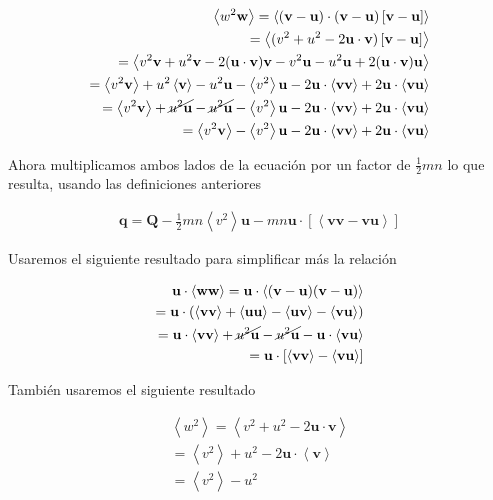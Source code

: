 \documentclass[11pt]{article}
\theoremstyle{definition}
\begin{document}
  \begin{eqnarray*}
    \left<w^2\textbf{w}\right> = \left<(\textbf{v} - \textbf{u})\cdot(\textbf{v} - \textbf{u})\left[\textbf{v} - \textbf{u}\right]\right> \\
    = \left<(v^2 + u^2 - 2\textbf{u}\cdot\textbf{v})\left[\textbf{v}-\textbf{u}\right]\right> \\
    = \left< v^2\textbf{v} + u^2\textbf{v} - 2(\textbf{u}\cdot\textbf{v})\textbf{v} - v^2\textbf{u} - u^2\textbf{u} + 2(\textbf{u}\cdot\textbf{v})\textbf{u}\right>\\
    = \left<v^2\textbf{v}\right> + u^2\left<\textbf{v}\right> - u^2\textbf{u} - \left<v^2\right>\textbf{u} - 2\textbf{u}\cdot\left<\textbf{vv}\right> + 2\textbf{u}\cdot\left<\textbf{vu}\right>\\
    = \left<v^2\textbf{v}\right> + \cancel{u^2\textbf{u}} - \cancel{u^2\textbf{u}} - \left<v^2\right>\textbf{u} - 2\textbf{u}\cdot\left<\textbf{vv}\right> + 2\textbf{u}\cdot\left<\textbf{vu}\right>\\
    = \left<v^2\textbf{v}\right> -\left<v^2\right>\textbf{u} - 2\textbf{u}\cdot\left<\textbf{vv}\right> + 2\textbf{u}\cdot\left<\textbf{vu}\right>
  \end{eqnarray*}

  Ahora multiplicamos ambos lados de la ecuaci\'on por un factor de $\frac{1}{2}mn$ lo que resulta, usando las definiciones anteriores 
  
  \begin{eqnarray*}
    \textbf{q} = \textbf{Q} - \frac{1}{2}mn\left<v^2\right>\textbf{u} - mn\textbf{u}\cdot[\left<\textbf{vv} - \textbf{vu}\right>]
  \end{eqnarray*}


  \begin{shaded}
  
    Usaremos el siguiente resultado para simplificar m\'as la relaci\'on
    
    \begin{eqnarray*}
      \textbf{u}\cdot\left<\textbf{ww}\right> = \textbf{u}\cdot\left<(\textbf{v} - \textbf{u})(\textbf{v} - \textbf{u})\right>\\
      = \textbf{u}\cdot(\left<\textbf{vv}\right> + \left<\textbf{uu}\right> - \left<\textbf{uv}\right> - \left<\textbf{vu}\right>) \\
      = \textbf{u}\cdot\left<\textbf{vv}\right> + \cancel{u^2\textbf{u}} - \cancel{u^2\textbf{u}} - \textbf{u}\cdot\left<\textbf{vu}\right>\\
      = \textbf{u}\cdot[\left<\textbf{vv}\right> - \left<\textbf{vu}\right>]
    \end{eqnarray*}

    Tambi\'en usaremos el siguiente resultado

    \begin{eqnarray*}
      \left<w^2\right> = \left<v^2 + u^2 - 2\textbf{u}\cdot\textbf{v}\right>\\
      = \left<v^2\right> + u^2 - 2\textbf{u}\cdot\left<\textbf{v}\right>\\
      = \left<v^2\right> - u^2
    \end{eqnarray*}
  \end{shaded}
\end{document}
